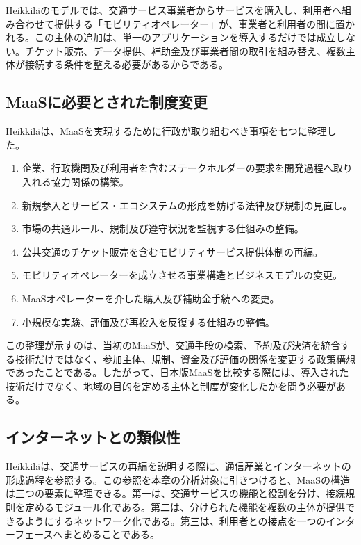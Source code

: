 Heikkiläのモデルでは、交通サービス事業者からサービスを購入し、利用者へ組み合わせて提供する「モビリティオペレーター」が、事業者と利用者の間に置かれる。この主体の追加は、単一のアプリケーションを導入するだけでは成立しない。チケット販売、データ提供、補助金及び事業者間の取引を組み替え、複数主体が接続する条件を整える必要があるからである。

\subsection{MaaSに必要とされた制度変更}
\label{subsec:ch4_governance}

Heikkiläは、MaaSを実現するために行政が取り組むべき事項を七つに整理した\cite{heikkila2014maas}。

\begin{enumerate}
\item 企業、行政機関及び利用者を含むステークホルダーの要求を開発過程へ取り入れる協力関係の構築。
\item 新規参入とサービス・エコシステムの形成を妨げる法律及び規制の見直し。
\item 市場の共通ルール、規制及び遵守状況を監視する仕組みの整備。
\item 公共交通のチケット販売を含むモビリティサービス提供体制の再編。
\item モビリティオペレーターを成立させる事業構造とビジネスモデルの変更。
\item MaaSオペレーターを介した購入及び補助金手続への変更。
\item 小規模な実験、評価及び再投入を反復する仕組みの整備。
\end{enumerate}

この整理が示すのは、当初のMaaSが、交通手段の検索、予約及び決済を統合する技術だけではなく、参加主体、規制、資金及び評価の関係を変更する政策構想であったことである。したがって、日本版MaaSを比較する際には、導入された技術だけでなく、地域の目的を定める主体と制度が変化したかを問う必要がある。

\subsection{インターネットとの類似性}
\label{subsec:ch4_internet_sim}

Heikkiläは、交通サービスの再編を説明する際に、通信産業とインターネットの形成過程を参照する\cite{heikkila2014maas}。この参照を本章の分析対象に引きつけると、MaaSの構造は三つの要素に整理できる。第一は、交通サービスの機能と役割を分け、接続規則を定めるモジュール化である。第二は、分けられた機能を複数の主体が提供できるようにするネットワーク化である。第三は、利用者との接点を一つのインターフェースへまとめることである。

